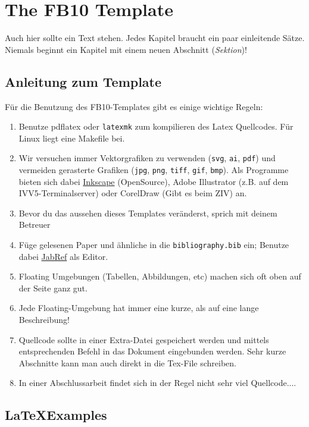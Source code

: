 \chapter{The FB10 Template}
Auch hier sollte ein Text stehen. Jedes Kapitel braucht ein paar einleitende Sätze. Niemals beginnt ein Kapitel mit einem neuen Abschnitt (\textit{Sektion})!
\section{Anleitung zum Template}
\label{secHowTo}
Für die  Benutzung des \gls{FB10}-Templates gibt es einige wichtige Regeln:
\begin{enumerate}
    \item Benutze \gls{pdflatex} oder \texttt{latexmk} zum kompilieren des  Latex Quellcodes. Für Linux liegt eine Makefile bei.

	\item Wir versuchen immer Vektorgrafiken zu verwenden (\texttt{svg}, \texttt{ai}, \texttt{pdf}) und vermeiden gerasterte Grafiken (\texttt{jpg}, \texttt{png}, \texttt{tiff}, \texttt{gif}, \texttt{bmp}). Als Programme bieten sich dabei \href{http://www.inkscape.org/}{Inkscape} (OpenSource), Adobe Illustrator (z.B. auf dem IVV5-Terminalserver) oder CorelDraw (Gibt es beim ZIV) an. 
	\item Bevor du das aussehen dieses Templates veränderst, sprich mit deinem Betreuer
	\item Füge gelesenen Paper und ähnliche in die \texttt{bibliography.bib} ein; Benutze dabei \href{http://jabref.sourceforge.net/}{JabRef} als Editor.
	\item Floating Umgebungen (Tabellen, Abbildungen, etc) machen sich oft oben auf der Seite ganz gut.
	\item Jede Floating-Umgebung hat immer eine kurze, als auf eine lange Beschreibung! 
	\item Quellcode sollte in einer Extra-Datei gespeichert werden und mittels entsprechenden Befehl in das Dokument eingebunden werden. Sehr kurze Abschnitte kann man auch direkt in die Tex-File schreiben.
	\item In einer Abschlussarbeit findet sich in der Regel nicht sehr viel Quellcode....
\end{enumerate}

\section{\LaTeX Examples}

